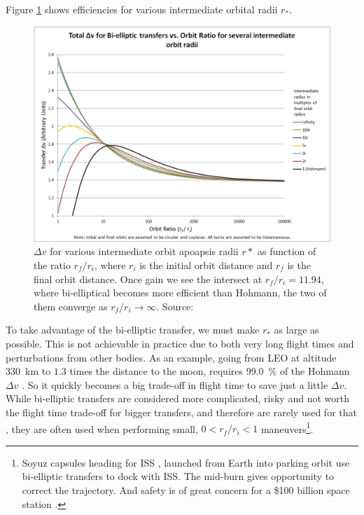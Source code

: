 Figure \ref{fig:hohmann_vs_bi-elliptic2} shows efficiencies for various intermediate orbital radii $r_*$.
\begin{figure}[ht]
\centering
\includegraphics[scale=.47]{fig/hohmann_vs_bi-elliptic2.png}
\caption{$\Delta v$ for various intermediate orbit apoapsis radii $r*$ as function of the ratio $r_f/r_i$, where $r_i$ is the initial orbit distance and $r_f$ is the final orbit distance. Once gain we see the intersect at $r_f/r_i = 11.94$, where bi-elliptical becomes more efficient than Hohmann, the two of them converge as $r_f/r_i \to \infty$. Source: \cite{Copperheadtnp}}
\label{fig:hohmann_vs_bi-elliptic2}
\end{figure}
To take advantage of the bi-elliptic transfer, we must make $r_*$ as large as possible. This is not achievable in practice due to both very long flight times and perturbations from other bodies. As an example, going from LEO at altitude \SI{330}{\km} to $1.3$ times the distance to the moon, requires \SI{99.0}{\percent} of the Hohmann $\Delta v$ \cite{wiki-bi-elliptic}. So it quickly becomes a big trade-off in flight time to save just a little $\Delta v$. While bi-elliptic transfers are considered more complicated, risky and not worth the flight time trade-off for bigger transfers, and therefore are rarely used for that \cite[p. 78]{Taylor2009}, they are often used when performing small, $0 < r_f/r_i < 1$ maneuvers\footnote{Soyuz capsules heading for ISS \cite{esa-soyuz}, launched from Earth into parking orbit use bi-elliptic transfers to dock with ISS. The mid-burn gives opportunity to correct the trajectory. And safety is of great concern for a \$100 billion space station \cite{iss-worth}.}.


